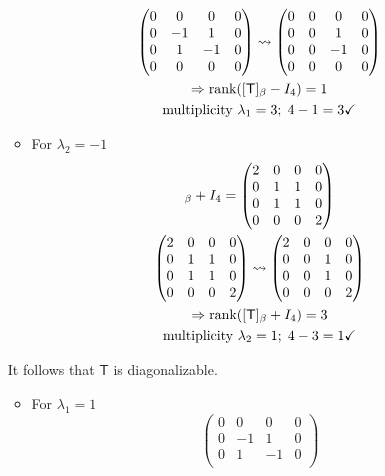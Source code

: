 \begin{enumerate}
\begin{itemize}
\begin{gather}
\begin{pmatrix}
0 & 0 & 0 & 0\\
0 & -1 & 1 & 0\\
0 & 1 & -1 & 0\\
0 & 0 & 0 & 0
\end{pmatrix}\leadsto
\begin{pmatrix}
0 & 0 & 0 & 0\\
0 & 0 & 1 & 0\\
0 & 0 & -1 & 0\\
0 & 0 & 0 & 0
\end{pmatrix}\\
\Rightarrow \text{rank}({[\mathsf{T}]_\beta -I_4}) = 1\\
\text{multiplicity } \lambda_1 =3; \; 4-1 =3 \checkmark
\end{gather}
\item For $\lambda_2 = -1$
\begin{gather}
[\mathsf{T}]_\beta +I_4 = 
\begin{pmatrix}
2 & 0 & 0 & 0\\
0 & 1 & 1 & 0\\
0 & 1 & 1 & 0\\
0 & 0 & 0 & 2
\end{pmatrix}\\
\begin{pmatrix}
2 & 0 & 0 & 0\\
0 & 1 & 1 & 0\\
0 & 1 & 1 & 0\\
0 & 0 & 0 & 2
\end{pmatrix}
\leadsto
\begin{pmatrix}
2 & 0 & 0 & 0\\
0 & 0 & 1 & 0\\
0 & 0 & 1 & 0\\
0 & 0 & 0 & 2
\end{pmatrix}\\
\implies \rank{[\mathsf{T}]_\beta +I_4} =3\\
\text{multiplicity } \lambda_2 =1; \; 4-3 =1 \checkmark
\end{gather}
\end{itemize}
It follows that $\mathsf{T}$ is diagonalizable.
\begin{itemize}
\item For $\lambda_1 = 1$
\begin{equation}
\begin{pmatrix}
0 & 0 & 0 & 0\\
0 & -1 & 1 & 0\\
0 & 1 & -1 & 0\\

\end{pmatrix}
\end{equation}
\end{itemize}
\end{enumerate}
